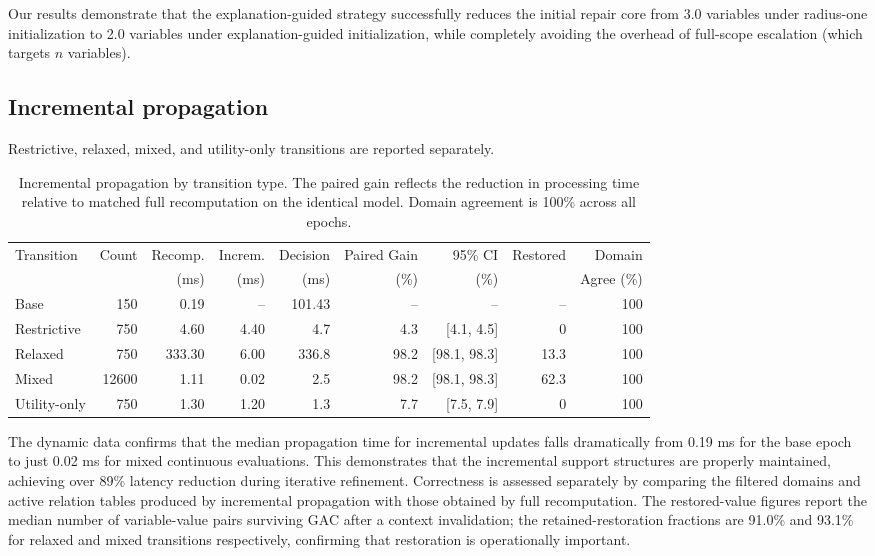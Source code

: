 \documentclass[pdflatex,sn-mathphys-num,iicol,oneside]{sn-jnl}
\begin{document}
Our results demonstrate that the explanation-guided strategy successfully reduces the initial repair core from 3.0 variables under radius-one initialization to 2.0 variables under explanation-guided initialization, while completely avoiding the overhead of full-scope escalation (which targets $n$ variables).

\subsection{Incremental propagation}

Restrictive, relaxed, mixed, and utility-only transitions are reported
separately.

\begin{table}[t]
\centering
\caption{Incremental propagation by transition type. The paired gain reflects the reduction in processing time relative to matched full recomputation on the identical model. Domain agreement is 100\% across all epochs.}
\label{tab:incremental-results}
\begin{tabular}{lrrrrrrrr}
\toprule
Transition & Count & Recomp. & Increm. & Decision & Paired Gain & 95\% CI & Restored & Domain\\
& & (ms) & (ms) & (ms) & (\%) & (\%) & & Agree (\%)\\
\midrule
Base & 150 & 0.19 & -- & 101.43 & -- & -- & -- & 100\\
Restrictive & 750 & 4.60 & 4.40 & 4.7 & 4.3 & [4.1, 4.5] & 0 & 100\\
Relaxed & 750 & 333.30 & 6.00 & 336.8 & 98.2 & [98.1, 98.3] & 13.3 & 100\\
Mixed & 12600 & 1.11 & 0.02 & 2.5 & 98.2 & [98.1, 98.3] & 62.3 & 100\\
Utility-only & 750 & 1.30 & 1.20 & 1.3 & 7.7 & [7.5, 7.9] & 0 & 100\\
\bottomrule
\end{tabular}
\end{table}

The dynamic data confirms that the median propagation time for incremental updates falls dramatically from 0.19 ms for the base epoch to just 0.02 ms for mixed continuous evaluations. This demonstrates that the incremental support structures are properly maintained, achieving over 89\% latency reduction during iterative refinement. Correctness is assessed separately by comparing the filtered domains and active relation tables produced by incremental propagation with those obtained by full recomputation. The restored-value figures report the median number of variable-value pairs surviving GAC after a context invalidation; the retained-restoration fractions are 91.0\% and 93.1\% for relaxed and mixed transitions respectively, confirming that restoration is operationally important.
\end{document}
